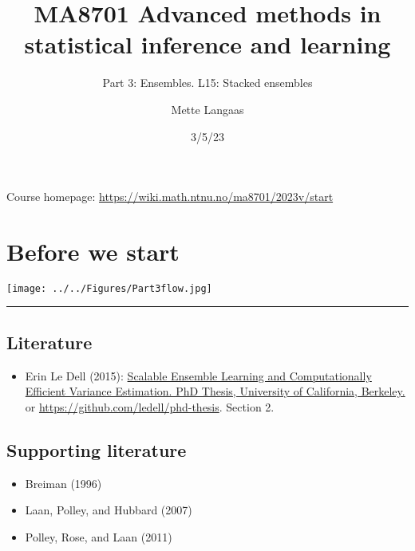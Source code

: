 \documentclass[
  letterpaper,
  DIV=11,
  numbers=noendperiod]{scrartcl}
\title{MA8701 Advanced methods in statistical inference and learning}
\subtitle{Part 3: Ensembles. L15: Stacked ensembles}
\author{Mette Langaas}
\date{3/5/23}
\providecommand{\tightlist}{%
  \setlength{\itemsep}{0pt}\setlength{\parskip}{0pt}}\usepackage{longtable,booktabs,array}
\renewcommand*\contentsname{Table of contents}
\newcommand\contentsname{Table of contents}
\begin{document}
\maketitle
\ifdefined\Shaded\renewenvironment{Shaded}{\begin{tcolorbox}[frame hidden, interior hidden, breakable, borderline west={3pt}{0pt}{shadecolor}, enhanced, sharp corners, boxrule=0pt]}{\end{tcolorbox}}\fi

\renewcommand*\contentsname{Table of contents}
{
\hypersetup{linkcolor=}
\setcounter{tocdepth}{3}
\tableofcontents
}
Course homepage: \url{https://wiki.math.ntnu.no/ma8701/2023v/start}

\hypertarget{before-we-start}{%
\section{Before we start}\label{before-we-start}}

\texttt{[image: ../../Figures/Part3flow.jpg]}

\begin{center}\rule{0.5\linewidth}{0.5pt}\end{center}

\hypertarget{literature}{%
\subsection{Literature}\label{literature}}

\begin{itemize}
\tightlist
\item
  Erin Le Dell (2015):
  \href{https://escholarship.org/uc/item/3kb142r2}{Scalable Ensemble
  Learning and Computationally Efficient Variance Estimation. PhD
  Thesis, University of California, Berkeley.} or
  \url{https://github.com/ledell/phd-thesis}. Section 2.
\end{itemize}

\hypertarget{supporting-literature}{%
\subsection{Supporting literature}\label{supporting-literature}}

\begin{itemize}
\tightlist
\item
  Breiman (1996)
\item
  Laan, Polley, and Hubbard (2007)
\item
  Polley, Rose, and Laan (2011)
\end{itemize}
\end{document}
